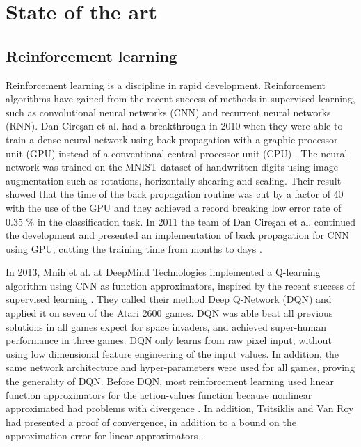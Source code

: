 \documentclass[class=book, crop=false, 11pt]{standalone}
\begin{document}
\chapter{State of the art}
\section{Reinforcement learning}
Reinforcement learning is a discipline in rapid development. Reinforcement algorithms have gained from the recent success of methods in supervised learning, such as convolutional neural networks (CNN) and  recurrent neural networks (RNN). Dan Cire\c{s}an et al. had a breakthrough in 2010 when they were able to train a dense neural network using back propagation with a graphic processor unit (GPU) instead of a conventional central processor unit (CPU) \cite{DNN_gpu_2010}. The neural network was trained on the MNIST dataset of handwritten digits using image augmentation such as rotations, horizontally shearing and scaling. Their result showed that the time of the back propagation routine was cut by a factor of 40 with the use of the GPU and they achieved a record breaking low error rate of 0.35 \% in the classification task. In 2011 the team of Dan Cire\c{s}an et al. continued the development and presented an implementation of back propagation for CNN using GPU, cutting the training time from months to days \cite{CNN_gpu_2011}.

In 2013, Mnih et al. at DeepMind Technologies implemented a Q-learning algorithm using CNN as function approximators, inspired by the recent success of supervised learning \cite{DQN_Mnih_et_al_2013}. They called their method Deep Q-Network (DQN) and applied it on seven of the Atari 2600 games. DQN was able beat all previous solutions in all games expect for space invaders, and achieved super-human performance in three games. DQN only learns from raw pixel input, without using low dimensional feature engineering of the input values. In addition, the same network architecture and hyper-parameters were used for all games, proving the generality of DQN. Before DQN, most reinforcement learning used linear function approximators for the action-values function because nonlinear approximated had problems with divergence \cite{DQN_Mnih_et_al_2013}. In addition, Tsitsiklis and Van Roy had presented a proof of convergence, in addition to a bound on the approximation error for linear approximators \cite{linear_stable_Tsitsiklis97}.
\end{document}
